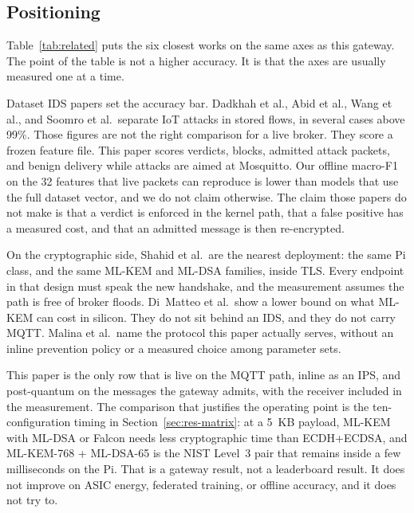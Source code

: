 \documentclass[journal]{IEEEtran}
\begin{document}
\subsection{Positioning}

Table~\ref{tab:related} puts the six closest works on the same axes as this gateway. The point of the table is not a higher accuracy. It is that the axes are usually measured one at a time.

Dataset IDS papers set the accuracy bar. Dadkhah et al., Abid et al., Wang et al., and Soomro et al.\ separate IoT attacks in stored flows, in several cases above 99\%. Those figures are not the right comparison for a live broker. They score a frozen feature file. This paper scores verdicts, blocks, admitted attack packets, and benign delivery while attacks are aimed at Mosquitto. Our offline macro-F1 on the 32 features that live packets can reproduce is lower than models that use the full dataset vector, and we do not claim otherwise. The claim those papers do not make is that a verdict is enforced in the kernel path, that a false positive has a measured cost, and that an admitted message is then re-encrypted.

On the cryptographic side, Shahid et al.\ are the nearest deployment: the same Pi class, and the same ML-KEM and ML-DSA families, inside TLS. Every endpoint in that design must speak the new handshake, and the measurement assumes the path is free of broker floods. Di~Matteo et al.\ show a lower bound on what ML-KEM can cost in silicon. They do not sit behind an IDS, and they do not carry MQTT. Malina et al.\ name the protocol this paper actually serves, without an inline prevention policy or a measured choice among parameter sets.

This paper is the only row that is live on the MQTT path, inline as an IPS, and post-quantum on the messages the gateway admits, with the receiver included in the measurement. The comparison that justifies the operating point is the ten-configuration timing in Section~\ref{sec:res-matrix}: at a 5~KB payload, ML-KEM with ML-DSA or Falcon needs less cryptographic time than ECDH+ECDSA, and ML-KEM-768 + ML-DSA-65 is the NIST Level~3 pair that remains inside a few milliseconds on the Pi. That is a gateway result, not a leaderboard result. It does not improve on ASIC energy, federated training, or offline accuracy, and it does not try to.
\end{document}
